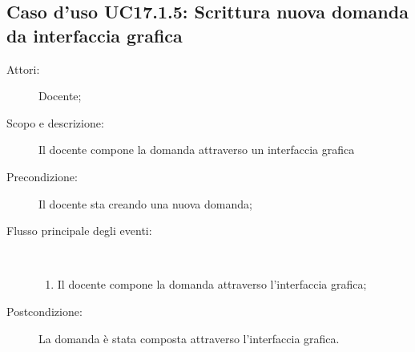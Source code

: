 \subsection{Caso d'uso UC17.1.5: Scrittura nuova domanda da interfaccia grafica}\begin{description}
	\item[Attori:] Docente;
	\item[Scopo e descrizione:] Il docente compone la domanda attraverso un interfaccia grafica
	\item[Precondizione:] Il docente sta creando una nuova domanda;
	
	\item[Flusso principale degli eventi:] \ 
	\begin{enumerate}
		\item Il docente compone la domanda attraverso l'interfaccia grafica;
		
	\end{enumerate}
	\item[Postcondizione:] La domanda è stata composta attraverso l'interfaccia grafica.
\end{description}
\hypertarget{UC17.2}{}
